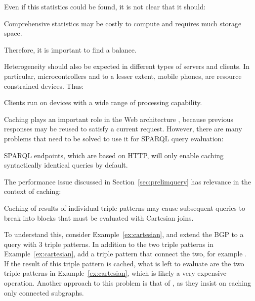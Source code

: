 Even if this statistics could be found, it is not clear that it should:
\begin{problem}\label{prob:largestats}
Comprehensive statistics may be costly to compute and requires much
storage space.
\end{problem}
Therefore, it is important to find a balance.



Heterogeneity should also be expected in different types of servers
and clients. In particular, microcontrollers and to a lesser extent,
mobile phones, are resource constrained devices. Thus:

\begin{problem}\label{prob:microcontroller}
Clients run on devices with a wide range of processing capability.
\end{problem}



Caching plays an important role in the Web architecture
\cite{Jacobs:04:AWW}, because previous responses may be reused to
satisfy a current request. However, there are many problems that need
to be solved to use it for SPARQL query evaluation:

\begin{problem}\label{prob:syntacticcache}
SPARQL endpoints, which are based on HTTP, will only enable caching
syntactically identical queries by  default.
\end{problem}

The performance issue discussed in Section~\ref{sec:prelimquery} has
relevance in the context of caching:

\begin{problem}\label{prob:cachecartesian}
Caching of results of individual triple patterns may cause subsequent
queries to break into blocks that must be evaluated with Cartesian joins.
\end{problem}

To understand this, consider Example~\ref{ex:cartesian}, and extend
the BGP to a query with 3 triple patterns. In addition to the two
triple patterns in Example~\ref{ex:cartesian}, add a triple pattern that
connect the two, for example
. If the result of this
triple pattern is cached, what is left to evaluate are the two triple
patterns in Example~\ref{ex:cartesian}, which is likely a very
expensive operation. Another approach to this problem is that of
\cite{papailiou2015graph}, as they insist on caching only connected 
subgraphs.

